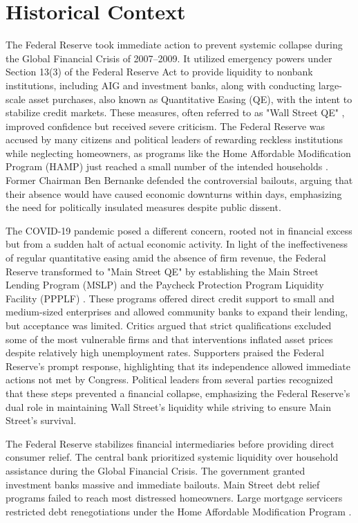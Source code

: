 \documentclass[12pt]{article}
\begin{document}
\section{Historical Context}
{} The Federal Reserve took immediate action to prevent systemic collapse during the Global Financial Crisis of 2007--2009. It utilized emergency powers under Section 13(3) of the Federal Reserve Act to provide liquidity to nonbank institutions, including AIG and investment banks, along with conducting large-scale asset purchases, also known as Quantitative Easing (QE), with the intent to stabilize credit markets. These measures, often referred to as "Wall Street QE" \parencite{Sims_2020}, improved confidence but received severe criticism. The Federal Reserve was accused by many citizens and political leaders of rewarding reckless institutions while neglecting homeowners, as programs like the Home Affordable Modification Program (HAMP) just reached a small number of the intended households \parencite{Agarwal_2017}. Former Chairman Ben Bernanke defended the controversial bailouts, arguing that their absence would have caused economic downturns within days, emphasizing the need for politically insulated measures despite public dissent.

{} The COVID-19 pandemic posed a different concern, rooted not in financial excess but from a sudden halt of actual economic activity. In light of the ineffectiveness of regular quantitative easing amid the absence of firm revenue, the Federal Reserve transformed to "Main Street QE" by establishing the Main Street Lending Program (MSLP) and the Paycheck Protection Program Liquidity Facility (PPPLF) \parencite{Sims_2020}. These programs offered direct credit support to small and medium-sized enterprises and allowed community banks to expand their lending, but acceptance was limited. Critics argued that strict qualifications excluded some of the most vulnerable firms and that interventions inflated asset prices despite relatively high unemployment rates. Supporters praised the Federal Reserve's prompt response, highlighting that its independence allowed immediate actions not met by Congress. Political leaders from several parties recognized that these steps prevented a financial collapse, emphasizing the Federal Reserve's dual role in maintaining Wall Street's liquidity while striving to ensure Main Street's survival.

{} The Federal Reserve stabilizes financial intermediaries before providing direct consumer relief. The central bank prioritized systemic liquidity over household assistance during the Global Financial Crisis. The government granted investment banks massive and immediate bailouts. Main Street debt relief programs failed to reach most distressed homeowners. Large mortgage servicers restricted debt renegotiations under the Home Affordable Modification Program \parencite{Agarwal_2017}.
\end{document}
